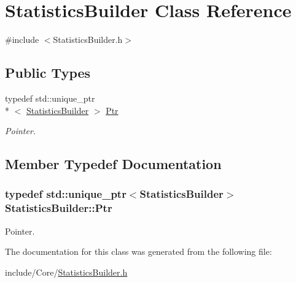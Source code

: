 \hypertarget{class_statistics_builder}{\section{Statistics\-Builder Class Reference}
\label{class_statistics_builder}
}


{\ttfamily \#include $<$Statistics\-Builder.\-h$>$}

\subsection*{Public Types}
\begin{DoxyCompactItemize}
\item 
typedef std\-::unique\-\_\-ptr\\*
$<$ \hyperlink{class_statistics_builder}{Statistics\-Builder} $>$ \hyperlink{class_statistics_builder_a004e4a71362f6accecdb3504ee328aa6}{Ptr}
\begin{DoxyCompactList}\small\item\em Pointer. \end{DoxyCompactList}\end{DoxyCompactItemize}


\subsection{Member Typedef Documentation}
\hypertarget{class_statistics_builder_a004e4a71362f6accecdb3504ee328aa6}{
\subsubsection[{Ptr}]{\setlength{\rightskip}{0pt plus 5cm}typedef std\-::unique\-\_\-ptr$<${\bf Statistics\-Builder}$>$ {\bf Statistics\-Builder\-::\-Ptr}}}\label{class_statistics_builder_a004e4a71362f6accecdb3504ee328aa6}


Pointer. 



The documentation for this class was generated from the following file\-:\begin{DoxyCompactItemize}
\item 
include/\-Core/\hyperlink{_statistics_builder_8h}{Statistics\-Builder.\-h}\end{DoxyCompactItemize}

